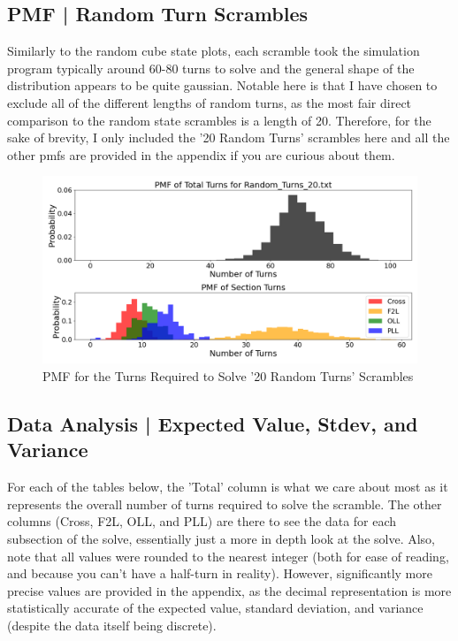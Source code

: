 \documentclass[12pt,letterpaper]{article}
\numberwithin{equation}{section}
\begin{document}
\subsection{PMF | Random Turn Scrambles}

Similarly to the random cube state plots, each scramble took the simulation program typically around 60-80 turns to solve and the general shape of the distribution appears to be quite gaussian. Notable here is that I have chosen to exclude all of the different lengths of random turns, as the most fair direct comparison to the random state scrambles is a length of 20. Therefore, for the sake of brevity, I only included the '20 Random Turns'  scrambles here and all the other pmfs are provided in the appendix if you are curious about them.

	\begin{figure}[H]
		\centering
		 \includegraphics[width=6in]{Figure_2.png}
		 \caption{PMF for the Turns Required to Solve '20 Random Turns' Scrambles}
		 \label{fig:pmf_random_tuns_png}
	\end{figure}
	
\subsection{Data Analysis | Expected Value, Stdev, and Variance}

For each of the tables below, the 'Total' column is what we care about most as it represents the overall number of turns required to solve the scramble. The other columns (Cross, F2L, OLL, and PLL) are there to see the data for each subsection of the solve, essentially just a more in depth look at the solve. Also, note that all values were rounded to the nearest integer (both for ease of reading, and because you can't have a half-turn in reality). However, significantly more precise values are provided in the appendix, as the decimal representation is more statistically accurate of the expected value, standard deviation, and variance (despite the data itself being discrete). 
\end{document}
